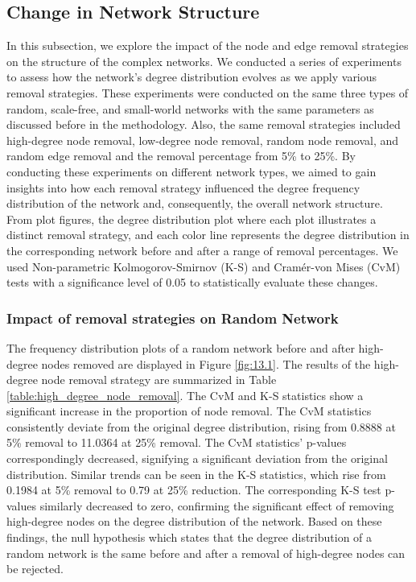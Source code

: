 \documentclass[conference]{IEEEtran} %
\begin{document}
\subsection{Change in Network Structure}

In this subsection, we explore the impact of the node and edge removal strategies on the structure of the complex networks. We conducted a series of experiments to assess how the network's degree distribution evolves as we apply various removal strategies. These experiments were conducted on the same three types of random, scale-free, and small-world networks with the same parameters as discussed before in the methodology. Also, the same removal strategies included high-degree node removal, low-degree node removal, random node removal, and random edge removal and the removal percentage from 5\% to 25\%. By conducting these experiments on different network types, we aimed to gain insights into how each removal strategy influenced the degree frequency distribution of the network and, consequently, the overall network structure. From plot figures, the degree distribution plot where each plot illustrates a distinct removal strategy, and each color line represents the degree distribution in the corresponding network before and after a range of removal percentages. We used Non-parametric Kolmogorov-Smirnov (K-S) and Cramér-von Mises (CvM) tests with a significance level of 0.05 to statistically evaluate these changes.

\subsubsection{Impact of removal strategies on Random Network}

The frequency distribution plots of a random network before and after high-degree nodes removed are displayed in Figure \ref{fig:13.1}. The results of the high-degree node removal strategy are summarized in Table \ref{table:high_degree_node_removal}. The CvM and K-S statistics show a significant increase in the proportion of node removal. The CvM statistics consistently deviate from the original degree distribution, rising from 0.8888 at 5\% removal to 11.0364 at 25\% removal. The CvM statistics' p-values correspondingly decreased, signifying a significant deviation from the original distribution. Similar trends can be seen in the K-S statistics, which rise from 0.1984 at 5\% removal to 0.79 at 25\% reduction. The corresponding K-S test p-values similarly decreased to zero, confirming the significant effect of removing high-degree nodes on the degree distribution of the network. Based on these findings, the null hypothesis which states that the degree distribution of a random network is the same before and after a removal of high-degree nodes can be rejected.
\end{document}
